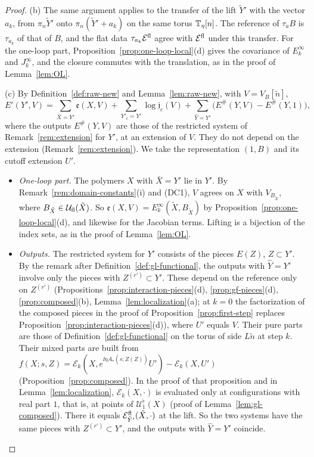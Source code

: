 \begin{proof}
(b) The same argument applies to the transfer of the lift $\tilde Y'$ with the vector $a_k$, from $\pi_n\tilde Y'$ onto $\pi_n(\tilde Y'+a_k)$ on the same torus $\mathbb T_\eta[n]$. The reference of $\tau_aB$ is $\tau_{a_k}$ of that of $B$, and the flat data $\tau_{a_k}\mathcal E^{\rm fl}$ agree with $\mathcal E^{\rm fl}$ under this transfer. For the one-loop part, Proposition~\ref{prop:one-loop-local}(d) gives the covariance of $E^\infty_k$ and $J^\infty_k$, and the closure commutes with the translation, as in the proof of Lemma~\ref{lem:OL}.

(c) By Definition~\ref{def:raw-new} and Lemma~\ref{lem:raw-new}, with $V=V_B[\tilde n]$,
\[
E'(Y',V)=\sum_{\bar X=Y'}\mathfrak e(X,V)+\sum_{Y'_c=Y'}\log\mathfrak j_c(V)+\sum_{\hat Y=Y'}\big(E^\#(Y,V)-E^\#(Y,1)\big),
\]
where the outputs $E^\#(Y,V)$ are those of the restricted system of Remark~\ref{rem:extension} for $Y'$, at an extension of $V$. They do not depend on the extension (Remark~\ref{rem:extension}). We take the representation $(1,B)$ and its cutoff extension $U'$.
\begin{itemize}
\item \emph{One-loop part.} The polymers $X$ with $\bar X=Y'$ lie in $Y'$. By Remark~\ref{rem:domain-constants}(i) and (DC1), $V$ agrees on $X$ with $V_{B_{\tilde X}}$, where $B_{\tilde X}\in\mathcal U_{\rm fl}(\tilde X)$. So $\mathfrak e(X,V)=E^\infty_k(\tilde X,B_{\tilde X})$ by Proposition~\ref{prop:one-loop-local}(d), and likewise for the Jacobian terms. Lifting is a bijection of the index sets, as in the proof of Lemma~\ref{lem:OL}.
\item \emph{Outputs.} The restricted system for $Y'$ consists of the pieces $E(Z)$, $Z\subset Y'$. By the remark after Definition~\ref{def:gl-functional}, the outputs with $\hat Y=Y'$ involve only the pieces with $Z^{(r')}\subset Y'$. These depend on the reference only on $Z^{(r')}$ (Propositions~\ref{prop:interaction-pieces}(d), \ref{prop:gf-pieces}(d), \ref{prop:composed}(b), Lemma~\ref{lem:localization}(a); at $k=0$ the factorization of the composed pieces in the proof of Proposition~\ref{prop:first-step} replaces Proposition~\ref{prop:interaction-pieces}(d)), where $U'$ equals $V$. Their pure parts are those of Definition~\ref{def:gl-functional} on the torus of side $L\tilde n$ at step $k$. Their mixed parts are built from $f(X;s,Z)=\mathcal E_k(X,e^{\ii\eta A_*(s;\hat Z(Z))}U')-\mathcal E_k(X,U')$ (Proposition~\ref{prop:composed}). In the proof of that proposition and in Lemma~\ref{lem:localization}, $\mathcal E_k(X,\cdot)$ is evaluated only at configurations with real part $1$, that is, at points of $\mathcal U^\flat_1(X)$ (proof of Lemma~\ref{lem:gl-composed}). There it equals $\mathcal E^{\rm fl}_{\tilde Y'}(\tilde X,\cdot)$ at the lift. So the two systems have the same pieces with $Z^{(r')}\subset Y'$, and the outputs with $\hat Y=Y'$ coincide.

\end{itemize}
\end{proof}

